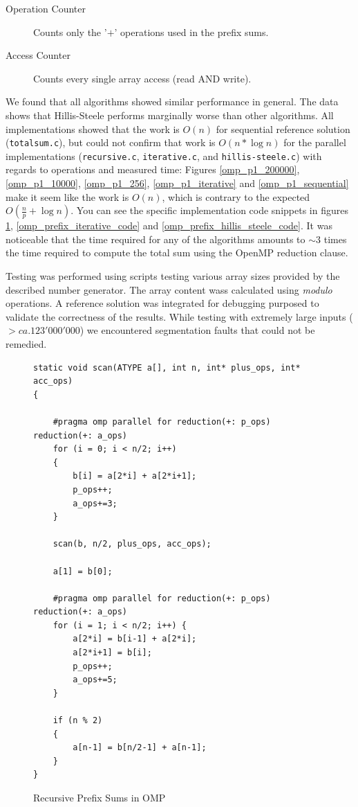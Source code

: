 \documentclass[12pt]{article}
\begin{document}
\begin{description}
\item[Operation Counter] Counts only the '$+$' operations used in the prefix sums. 
\item[Access Counter] Counts every single array access (read AND write).
\end{description}

We found that all algorithms showed similar performance in general. The data shows that Hillis-Steele performs marginally worse than other algorithms. All implementations showed that the work is $O(n)$ for sequential reference solution (\verb=totalsum.c=), but could not confirm that work is $O(n * \log n)$ for the parallel implementations (\verb=recursive.c=, \verb=iterative.c=, and \verb=hillis-steele.c=) with regards to operations and measured time: Figures \ref{omp_p1_200000}, \ref{omp_p1_10000}, \ref{omp_p1_256}, \ref{omp_p1_iterative} and \ref{omp_p1_sequential} make it seem like the work is $O(n)$, which is contrary to the expected $O(\frac{n}{p} + \log n)$.
You can see the specific implementation code snippets in figures \ref{omp_prefix_recursive_code}, \ref{omp_prefix_iterative_code} and \ref{omp_prefix_hillis_steele_code}. It was noticeable that the time required for any of the algorithms amounts to $\sim 3$ times the time required to compute the total sum using the OpenMP reduction clause.

Testing was performed using scripts testing various array sizes provided by the described number generator. The array content wass calculated using \emph{modulo} operations. A reference solution was integrated for debugging purposed to validate the correctness of the results. While testing with extremely large inputs ($> ca. 123'000'000$) we encountered segmentation faults that could not be remedied.

\begin{figure}[H]
\caption{Recursive Prefix Sums in OMP}
\begin{lstlisting}
static void scan(ATYPE a[], int n, int* plus_ops, int* acc_ops)
{

	#pragma omp parallel for reduction(+: p_ops) reduction(+: a_ops)
	for (i = 0; i < n/2; i++) 
	{
		b[i] = a[2*i] + a[2*i+1];
		p_ops++;
		a_ops+=3;
	}

	scan(b, n/2, plus_ops, acc_ops);

	a[1] = b[0];

	#pragma omp parallel for reduction(+: p_ops) reduction(+: a_ops)
	for (i = 1; i < n/2; i++) {
		a[2*i] = b[i-1] + a[2*i];
		a[2*i+1] = b[i];
		p_ops++;
		a_ops+=5;
	}

	if (n % 2)
	{
		a[n-1] = b[n/2-1] + a[n-1];
	}
}
\end{lstlisting}
\label{omp_prefix_recursive_code}
\end{figure}
\end{document}
